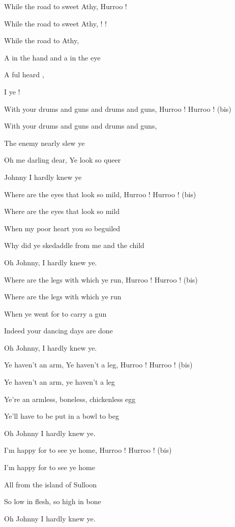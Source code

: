 \begin{SBVerse*}
While  the road to sweet Athy,  Hurroo !

While  the road to sweet Athy,  !  !

While  the road to  Athy,

A  in the hand and a  in the eye

A ful   heard ,

 I   ye !
\end{SBVerse*}

\bigskip

\begin{SBChorus}
With your drums and guns and drums and guns, Hurroo ! Hurroo ! (bis)

With your drums and guns and drums and guns,

The enemy nearly slew ye

Oh me darling dear, Ye look so queer

Johnny I hardly knew ye
\end{SBChorus}

\bigskip

Where are the eyes that look so mild, Hurroo ! Hurroo ! (bis)

Where are the eyes that look so mild

When my poor heart you so beguiled

Why did ye skedaddle from me and the child

Oh Johnny, I hardly knew ye.

\bigskip

Where are the legs with which ye run, Hurroo ! Hurroo ! (bis)

Where are the legs with which ye run

When ye went for to carry a gun

Indeed your dancing days are done

Oh Johnny, I hardly knew ye.

\bigskip

Ye haven't an arm, Ye haven't a leg, Hurroo ! Hurroo ! (bis)

Ye haven't an arm, ye haven't a leg

Ye're an armless, boneless, chickenless egg

Ye'll have to be put in a bowl to beg

Oh Johnny I hardly knew ye.

\bigskip

I'm happy for to see ye home, Hurroo ! Hurroo ! (bis)

I'm happy for to see ye home

All from the island of Sulloon

So low in flesh, so high in bone

Oh Johnny I hardly knew ye.

